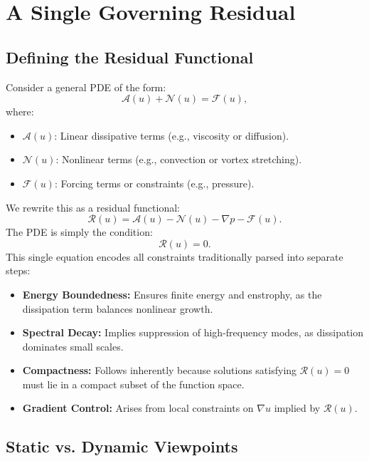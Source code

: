 \documentclass[12pt]{article}
\begin{document}
\section{A Single Governing Residual}

\subsection{Defining the Residual Functional}
Consider a general PDE of the form:
\begin{equation}
\mathcal{A}(u) + \mathcal{N}(u) = \mathcal{F}(u),
\end{equation}
where:
\begin{itemize}
    \item \(\mathcal{A}(u)\): Linear dissipative terms (e.g., viscosity or diffusion).
    \item \(\mathcal{N}(u)\): Nonlinear terms (e.g., convection or vortex stretching).
    \item \(\mathcal{F}(u)\): Forcing terms or constraints (e.g., pressure).
\end{itemize}

We rewrite this as a residual functional:
\begin{equation}
\mathcal{R}(u) = \mathcal{A}(u) - \mathcal{N}(u) - \nabla p - \mathcal{F}(u).
\end{equation}
The PDE is simply the condition:
\begin{equation}
\mathcal{R}(u) = 0.
\end{equation}
This single equation encodes all constraints traditionally parsed into separate steps:
\begin{itemize}
    \item \textbf{Energy Boundedness:} Ensures finite energy and enstrophy, as the dissipation term balances nonlinear growth.
    \item \textbf{Spectral Decay:} Implies suppression of high-frequency modes, as dissipation dominates small scales.
    \item \textbf{Compactness:} Follows inherently because solutions satisfying \(\mathcal{R}(u) = 0\) must lie in a compact subset of the function space.
    \item \textbf{Gradient Control:} Arises from local constraints on \(\nabla u\) implied by \(\mathcal{R}(u)\).
\end{itemize}

\subsection{Static vs. Dynamic Viewpoints}
\end{document}
